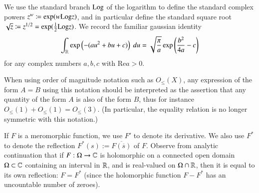 We use the standard branch ${\operatorname{Log}}$ of the logarithm to define the standard complex powers $z^w \coloneqq \exp( w {\operatorname{Log}} z)$, and in particular define the standard square root $\sqrt{z} \coloneqq z^{1/2} = \exp( \frac{1}{2} {\operatorname{Log}} z)$.  We record the familiar gaussian identity
\begin{equation}\label{gaussian}
 \int_{\mathbb{R}} \exp\left(-(au^2+bu+c)\right)\ du = \sqrt{\frac{\pi}{a}} \exp\left( \frac{b^2}{4a} - c\right)
\end{equation}
for any complex numbers $a,b,c$ with $\mathrm{Re} a > 0$.

When using order of magnitude notation such as $O_{\leq}(X)$, any expression of the form $A=B$ using this notation should be interpreted as the assertion that any quantity of the form $A$ is also of the form $B$, thus for instance $O_{\leq}(1) + O_{\leq}(1) = O_{\leq}(3)$.  (In particular, the equality relation is no longer symmetric with this notation.)

If $F$ is a meromorphic function, we use $F'$ to denote its derivative.  We also use $F^*$ to denote the reflection $F^*(s) := \overline{F(\overline{s})}$ of $F$.  Observe from analytic continuation that if $F:\Omega \to \mathbb{C}$ is holomorphic on a connected open domain $\Omega \subset \mathbb{C}$ containing an interval in $\mathbb{R}$, and is real-valued on $\Omega \cap \mathbb{R}$, then it is equal to its own reflection: $F = F^*$ (since the holomorphic function $F - F^*$ has an uncountable number of zeroes).


